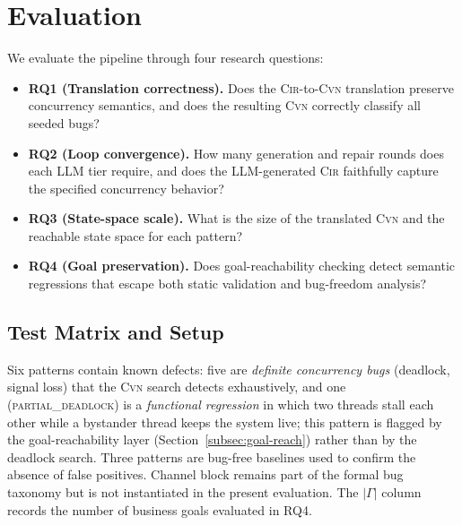 \section{Evaluation}
\label{sec:evaluation}

We evaluate the pipeline through four research questions:

\begin{itemize}[leftmargin=1.4em]
  \item \textbf{RQ1 (Translation correctness).}
    Does the \textsc{Cir}-to-\textsc{Cvn} translation preserve concurrency semantics, and does the resulting
    \textsc{Cvn} correctly classify all seeded bugs?
  \item \textbf{RQ2 (Loop convergence).}
    How many generation and repair rounds does each LLM tier require, and does the LLM-generated \textsc{Cir}
    faithfully capture the specified concurrency behavior?
  \item \textbf{RQ3 (State-space scale).}
    What is the size of the translated \textsc{Cvn} and the reachable state space for each pattern?
  \item \textbf{RQ4 (Goal preservation).}
    Does goal-reachability checking detect semantic regressions that escape both static validation and
    bug-freedom analysis?
\end{itemize}

\subsection{Test Matrix and Setup}
\label{subsec:test-matrix}

Six patterns contain known defects: five are \emph{definite concurrency bugs} (deadlock, signal loss) that the \textsc{Cvn} search detects exhaustively, and one (\textsc{partial\_deadlock}) is a \emph{functional regression} in which two threads stall each other while a bystander thread keeps the system live; this pattern is flagged by the goal-reachability layer (Section~\ref{subsec:goal-reach}) rather than by the deadlock search. Three patterns are bug-free baselines used to confirm the absence of false positives. Channel block remains part of the formal bug taxonomy but is not instantiated in the present evaluation. The $|\Gamma|$ column records the number of business goals evaluated in RQ4.

